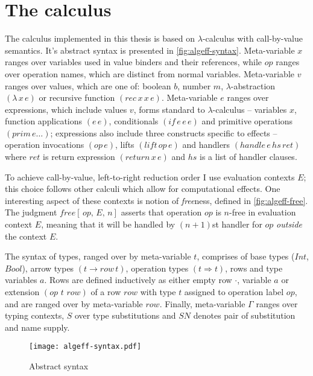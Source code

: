 \documentclass[inz, english, shortabstract]{iithesis}
\newcommand{\LC}{\(\lambda\)-calculus}
\begin{document}
\chapter{The calculus}\label{ch:calculus}
The calculus implemented in this thesis is based on \LC{} with call-by-value semantics.
It's abstract syntax is presented in \autoref{fig:algeff-syntax}.
Meta-variable $ x $ ranges over variables used in value binders and their references, while $ op $ ranges over operation names, which are distinct from normal variables.
Meta-variable $ v $ ranges over values, which are one of: boolean $ b $, number $ m $, $ \lambda $-abstraction $ (\lambda \, x \, e) $ or recursive function $ (rec \, x \, x \, e) $.
Meta-variable $ e $ ranges over expressions, which include values $ v $, forms standard to \LC{} -- variables $ x $, function applications $ (e \, e) $, conditionals $ (if \, e \,e \, e) $ and primitive operations $ (prim \, e \ldots) $; expressions also include three constructs specific to effects -- operation invocations $ (op \, e) $, lifts $ (lift \, op \, e) $ and handlers $ (handle \, e \, hs \, ret) $ where $ ret $ is return expression $ (return \, x \, e) $ and $ hs $ is a list of handler clauses.

To achieve call-by-value, left-to-right reduction order I use evaluation contexts $ E $; this choice follows other calculi which allow for computational effects\cite{Biernacki2017, Leijen2014, Hillerstrom2016}.
One interesting aspect of these contexts is notion of \emph{free}ness\cite{Biernacki2017}, defined in \autoref{fig:algeff-free}.
The judgment $ free[ \, op , \, E , \, n] $ asserts that operation $ op $ is $ n $-free in evaluation context $ E $, meaning that it will be handled by $(n + 1)$st handler for $ op $ \emph{outside} the context $ E $.

The syntax of types, ranged over by meta-variable $ t $, comprises of base types ($Int$, $Bool$), arrow types $(t \rightarrow row \, t)$, operation types $(t \Rightarrow t)$, rows and type variables $ a $.
Rows are defined inductively as either empty row $\cdot$, variable $ a $ or extension $(op \,\, t \,\, row)$ of a row $row$ with type $t$ assigned to operation label $op$, and are ranged over by meta-variable $row$.
Finally, meta-variable $\Gamma$ ranges over typing contexts, $S$ over type substitutions and $SN$ denotes pair of substitution and name supply.

\begin{figure}
  \centering
  \texttt{[image: algeff-syntax.pdf]}
  \caption{Abstract syntax}
  \label{fig:algeff-syntax}
\end{figure}
\end{document}

